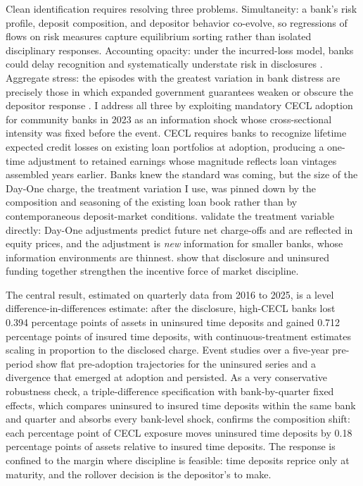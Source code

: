 Clean identification requires resolving three problems.  Simultaneity:
a bank's risk profile, deposit composition, and depositor behavior
co-evolve, so regressions of flows on risk measures capture equilibrium
sorting rather than isolated disciplinary responses.  Accounting
opacity: under the incurred-loss model, banks could delay recognition
and systematically understate risk in disclosures
\citep{beatty2011delays, bushman2015delayed}.  Aggregate stress: the
episodes with the greatest variation in bank distress are precisely
those in which expanded government guarantees weaken or obscure the
depositor response \citep{berger2015depositors, bennett2015market}.  I address all
three by exploiting mandatory CECL adoption for community banks in 2023
as an information shock whose cross-sectional intensity was fixed
before the event.  CECL requires banks to recognize lifetime expected
credit losses on existing loan portfolios at adoption, producing a
one-time adjustment to retained earnings whose magnitude reflects loan
vintages assembled years earlier.  Banks knew the standard was coming,
but the size of the Day-One charge, the treatment variation I use, was
pinned down by the composition and seasoning of the existing loan book
rather than by contemporaneous deposit-market conditions.
\citet{gee2022decision} validate the treatment variable directly:
Day-One adjustments predict future net charge-offs and are reflected
in equity prices, and the adjustment is \emph{new} information
for smaller banks, whose information environments are
thinnest.  \citet{nier2006market} show that disclosure and uninsured
funding together strengthen the incentive force of market discipline.

The central result, estimated on quarterly data from 2016 to 2025, is
a level difference-in-differences estimate: after the
disclosure, high-CECL banks lost 0.394 percentage points of assets in
uninsured time deposits and gained 0.712 percentage points of insured
time deposits, with continuous-treatment estimates scaling in
proportion to the disclosed charge.  Event studies over a five-year
pre-period show flat pre-adoption trajectories for the uninsured
series and a divergence that emerged at adoption and persisted.  As a
very conservative robustness check, a triple-difference specification
with bank-by-quarter fixed effects, which compares uninsured to
insured time deposits within the same bank and quarter and absorbs
every bank-level shock, confirms the composition shift: each
percentage point of CECL exposure moves uninsured time deposits by
0.18 percentage points of assets relative to insured time deposits.
The response is confined to the margin where discipline is feasible:
time deposits reprice only at maturity, and the rollover decision is
the depositor's to make.

